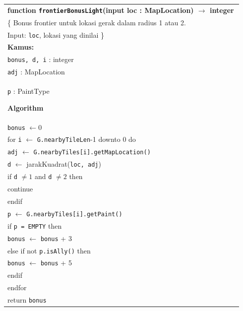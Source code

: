 \documentclass{article}
\newenvironment{pseudobox}
{
\centering
\begin{longtable}{|p{0.94\linewidth}|}
\hline
}
{
\\ \hline
\end{longtable}
\vspace{0.05cm}
}
\begin{document}
\begin{enumerate}[label=\alph*.]
\begin{enumerate}[label=\alph*.]
\begin{pseudobox}
\textbf{function \texttt{frontierBonusLight}(input loc : MapLocation) $\rightarrow$ integer} \\
\{ Bonus frontier untuk lokasi gerak dalam radius 1 atau 2. \\
Input: \texttt{loc}, lokasi yang dinilai
\}\\

\textbf{Kamus:} \\
\hspace*{1.5em}\texttt{bonus, d, i} : integer \\
\hspace*{1.5em}\texttt{adj} : MapLocation \\
\hspace*{1.5em}\texttt{p} : PaintType

\textbf{Algorithm} \\
\hspace*{1.5em}\texttt{bonus} $\leftarrow 0$ \\
\hspace*{1.5em}for \texttt{i} $\leftarrow$ \texttt{G.nearbyTileLen}-1 downto 0 do \\
\hspace*{3em}\texttt{adj} $\leftarrow$ \texttt{G.nearbyTiles[i].getMapLocation()} \\
\hspace*{3em}\texttt{d} $\leftarrow$ jarakKuadrat(\texttt{loc, adj}) \\
\hspace*{3em}if \texttt{d} $\neq 1$ and \texttt{d} $\neq 2$ then \\
\hspace*{4.5em}continue \\
\hspace*{3em}endif \\

\hspace*{3em}\texttt{p} $\leftarrow$ \texttt{G.nearbyTiles[i].getPaint()} \\
\hspace*{3em}if \texttt{p = EMPTY} then \\
\hspace*{4.5em}\texttt{bonus} $\leftarrow$ \texttt{bonus} + 3 \\
\hspace*{3em}else if not \texttt{p.isAlly()} then \\
\hspace*{4.5em}\texttt{bonus} $\leftarrow$ \texttt{bonus} + 5 \\
\hspace*{3em}endif \\
\hspace*{1.5em}endfor \\
\hspace*{1.5em}return \texttt{bonus}
\end{pseudobox}


\end{enumerate}
\end{enumerate}
\end{document}
